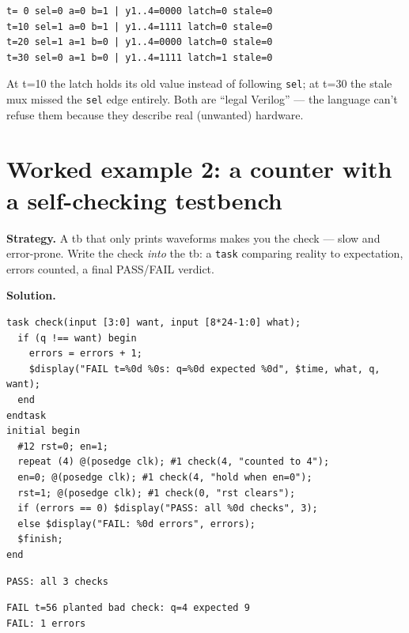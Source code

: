 \begin{lstlisting}[caption={Real run of \ttfamily ch11\_mux4\_tb.v.
Notice t=10: the legal muxes go to \texttt{b=1}, the latch and the
stale copy stay at 0 --- the two bugs caught in one row each.},
abovecaptionskip=0pt]
t= 0 sel=0 a=0 b=1 | y1..4=0000 latch=0 stale=0
t=10 sel=1 a=0 b=1 | y1..4=1111 latch=0 stale=0
t=20 sel=1 a=1 b=0 | y1..4=0000 latch=0 stale=0
t=30 sel=0 a=1 b=0 | y1..4=1111 latch=1 stale=0
\end{lstlisting}

At t=10 the latch holds its old value instead of following
\texttt{sel}; at t=30 the stale mux missed the \texttt{sel} edge
entirely. Both are ``legal Verilog'' --- the language can't refuse them
because they describe real (unwanted) hardware.

\section{Worked example 2: a counter with a self-checking testbench}
\label{sec:we-counter2}

\textbf{Strategy.} A tb that only prints waveforms makes you the check
--- slow and error-prone. Write the check \emph{into} the tb: a
\texttt{task} comparing reality to expectation, errors counted, a final
PASS/FAIL verdict.

\textbf{Solution.}
\begin{lstlisting}[caption={\ttfamily code/ch11\_counter2\_tb.v ---
the check task and the three assertions.},label={lst:tb2}]
task check(input [3:0] want, input [8*24-1:0] what);
  if (q !== want) begin
    errors = errors + 1;
    $display("FAIL t=%0d %0s: q=%0d expected %0d", $time, what, q, want);
  end
endtask
initial begin
  #12 rst=0; en=1;
  repeat (4) @(posedge clk); #1 check(4, "counted to 4");
  en=0; @(posedge clk); #1 check(4, "hold when en=0");
  rst=1; @(posedge clk); #1 check(0, "rst clears");
  if (errors == 0) $display("PASS: all %0d checks", 3);
  else $display("FAIL: %0d errors", errors);
  $finish;
end
\end{lstlisting}

\begin{lstlisting}[caption={Real output --- and proof the checker
bites: the second run compiles the same tb with \texttt{-DSABOTAGE},
planting one wrong expectation on purpose.},abovecaptionskip=0pt]
PASS: all 3 checks
\end{lstlisting}
\begin{lstlisting}[caption={The sabotaged run --- \texttt{FAIL} lines
name the check, the value, and the expectation.},abovecaptionskip=0pt]
FAIL t=56 planted bad check: q=4 expected 9
FAIL: 1 errors
\end{lstlisting}


